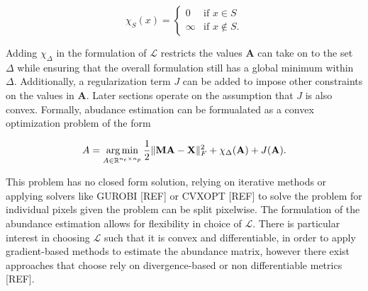 \begin{equation}
    \label{ae:indfunc}
    \chi_{S}(x) = 
            \begin{cases}
            0 &\text{if } x \in S \\
            \infty &\text{if } x \not \in S.
            \end{cases}
\end{equation}

Adding $\chi_\Delta$ in the formulation of $\mathcal{L}$ restricts the values $\mathbf{A}$ can take on to the set $\Delta$ while ensuring that the overall formulation still has a global minimum within $\Delta$. Additionally, a regularization term $J$ can be added to impose other constraints on the values in $\mathbf{A}$. Later sections operate on the assumption that $J$ is also convex. Formally, abudance estimation can be formualated as a convex optimization problem of the form

\begin{equation}
    \label{ae:ae-min-1}
    A = \operatorname*{arg\,min}_{A \in \mathbb{R}^{n_e \times n_p}} \frac{1}{2}\|\mathbf{MA} - \mathbf{X}\|_F^2 + \chi_\Delta(\mathbf{A}) + J(\mathbf{A}).
\end{equation}

This problem has no closed form solution, relying on iterative methods or applying solvers like GUROBI [REF] or CVXOPT [REF] to solve the problem for individual pixels given the problem can be split pixelwise. The formulation of the abundance estimation allows for flexibility in choice of $\mathcal{L}$. There is particular interest in choosing $\mathcal{L}$ such that it is convex and differentiable, in order to apply gradient-based methods to estimate the abundance matrix, however there exist approaches that choose rely on divergence-based or non differentiable metrics [REF].